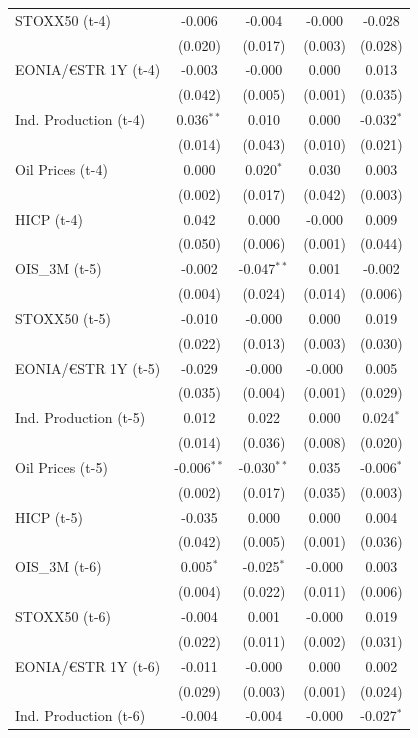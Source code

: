 \begin{longtable}[t]{lcccc}
STOXX50 (t-4) & -0.006 & -0.004 & -0.000 & -0.028\\
 & (0.020) & (0.017) & (0.003) & (0.028)\\
EONIA/€STR 1Y (t-4) & -0.003 & -0.000 & 0.000 & 0.013\\
 & (0.042) & (0.005) & (0.001) & (0.035)\\
Ind. Production (t-4) & 0.036$^{**}$ & 0.010 & 0.000 & -0.032$^{*}$\\
 & (0.014) & (0.043) & (0.010) & (0.021)\\
Oil Prices (t-4) & 0.000 & 0.020$^{*}$ & 0.030 & 0.003\\
 & (0.002) & (0.017) & (0.042) & (0.003)\\
HICP (t-4) & 0.042 & 0.000 & -0.000 & 0.009\\
 & (0.050) & (0.006) & (0.001) & (0.044)\\
OIS\_3M (t-5) & -0.002 & -0.047$^{**}$ & 0.001 & -0.002\\
 & (0.004) & (0.024) & (0.014) & (0.006)\\
STOXX50 (t-5) & -0.010 & -0.000 & 0.000 & 0.019\\
 & (0.022) & (0.013) & (0.003) & (0.030)\\
EONIA/€STR 1Y (t-5) & -0.029 & -0.000 & -0.000 & 0.005\\
 & (0.035) & (0.004) & (0.001) & (0.029)\\
Ind. Production (t-5) & 0.012 & 0.022 & 0.000 & 0.024$^{*}$\\
 & (0.014) & (0.036) & (0.008) & (0.020)\\
Oil Prices (t-5) & -0.006$^{**}$ & -0.030$^{**}$ & 0.035 & -0.006$^{*}$\\
 & (0.002) & (0.017) & (0.035) & (0.003)\\
HICP (t-5) & -0.035 & 0.000 & 0.000 & 0.004\\
 & (0.042) & (0.005) & (0.001) & (0.036)\\
OIS\_3M (t-6) & 0.005$^{*}$ & -0.025$^{*}$ & -0.000 & 0.003\\
 & (0.004) & (0.022) & (0.011) & (0.006)\\
STOXX50 (t-6) & -0.004 & 0.001 & -0.000 & 0.019\\
 & (0.022) & (0.011) & (0.002) & (0.031)\\
EONIA/€STR 1Y (t-6) & -0.011 & -0.000 & 0.000 & 0.002\\
 & (0.029) & (0.003) & (0.001) & (0.024)\\
Ind. Production (t-6) & -0.004 & -0.004 & -0.000 & -0.027$^{*}$\\

\end{longtable}
